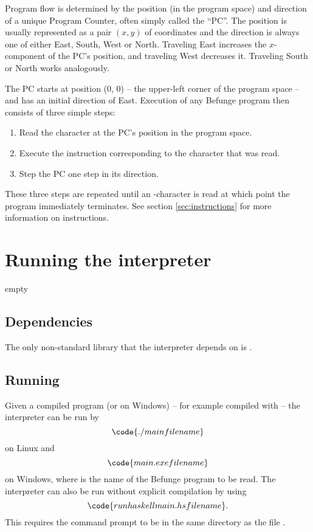 \documentclass[12pt, a4paper]{article}
\begin{document}
Program flow is determined by the position (in the program space) and direction of a unique Program Counter, often simply called the “PC”. The position is usually represented as a pair $(x, y)$ of coordinates and the direction is always one of either East, South, West or North. Traveling East increases the $x$-component of the PC's position, and traveling West decreases it. Traveling South or North works analogously.

The PC starts at position (0, 0) -- the upper-left corner of the program space -- and has an initial direction of East. Execution of any Befunge program then consists of three simple steps:
\begin{enumerate}

\item Read the character at the PC's position in the program space.
\item Execute the instruction corresponding to the character that was read.
\item Step the PC one step in its direction.

\end{enumerate}
These three steps are repeated until an -character is read at which point the program immediately terminates. See section \ref{sec:instructions} for more information on instructions.

\section{Running the interpreter}
\label{sec:howtorun}

empty

\subsection{Dependencies}
\label{dependencies}

The only non-standard library that the interpreter depends on is .

\subsection{Running}
\label{sec:run}

Given a compiled program  (or  on Windows) -- for example compiled with  -- the interpreter can be run by
$$\code{./main filename}$$
on Linux and
$$\code{main.exe filename}$$
on Windows, where  is the name of the Befunge program to be read. The interpreter can also be run without explicit compilation by using
$$\code{runhaskell main.hs filename}.$$
This requires the command prompt to be in the same directory as the file .
\end{document}
